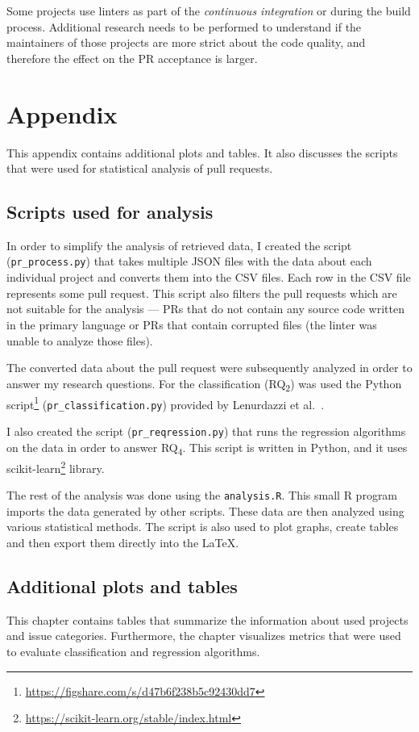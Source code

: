 \documentclass[digital,oneside,oldtable,nolof,nolot,nocover]{fithesis4}
\begin{document}
Some projects use linters as part of the \emph{continuous integration} or
during the build process. Additional research needs to be performed to
understand if the maintainers of those projects are more strict about the
code quality, and therefore the effect on the PR acceptance is larger.
\chapter*{Appendix}
\label{sec:org7dc9df6}
\pagestyle{plain}
This appendix contains additional plots and tables. It also discusses the scripts that were
used for statistical analysis of pull requests.
\section*{Scripts used for analysis}
\label{sec:org773af6b}
In order to simplify the analysis of retrieved data, I created the script (\texttt{pr\_process.py}) that
takes multiple JSON files with the data about each individual project and
converts them into the CSV files. Each row in the CSV file represents some
pull request. This script also filters the pull requests which are not
suitable for the analysis --- PRs that do not contain any source code written
in the primary language or PRs that contain corrupted files (the linter was
unable to analyze those files).

The converted data about the pull request were subsequently analyzed in order
to answer my research questions. For the classification (RQ\textsubscript{2}) was used the Python
script\footnote{\url{https://figshare.com/s/d47b6f238b5c92430dd7}} (\texttt{pr\_classification.py}) provided by Lenurdazzi
et al.~\cite{quality}.

I also created the script (\texttt{pr\_reqression.py}) that runs the regression algorithms on the data in order to answer RQ\textsubscript{4}.
This script is written in Python, and it uses scikit-learn\footnote{\url{https://scikit-learn.org/stable/index.html}} library.

The rest of the analysis was done using the \texttt{analysis.R}. This small R program imports the data
generated by other scripts. These data are then analyzed using various statistical methods.
The script is also used to plot graphs, create tables and then export them directly into the \LaTeX{}.
\section*{Additional plots and tables}
\label{sec:orga060968}
This chapter contains tables that summarize the information about used projects and issue categories.
Furthermore, the chapter visualizes metrics that were used to evaluate classification and regression algorithms.
\newpage
{}
\end{document}
